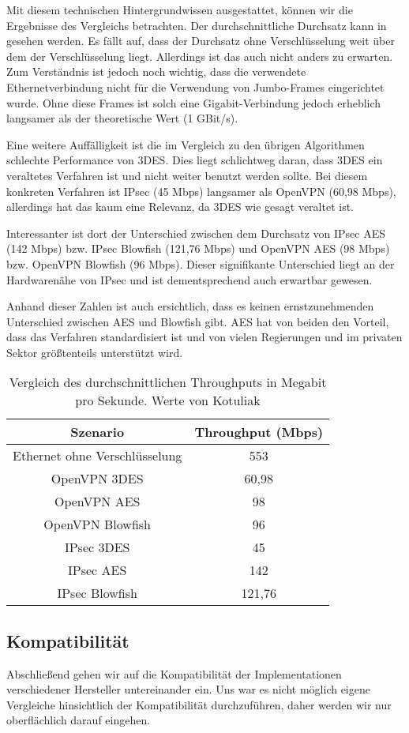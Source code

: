 \documentclass[12pt]{scrartcl}
\begin{document}
Mit diesem technischen Hintergrundwissen ausgestattet, können wir die Ergebnisse des Vergleichs betrachten. Der durchschnittliche Durchsatz kann in  gesehen werden. Es fällt auf, dass der Durchsatz ohne Verschlüsselung weit über dem der Verschlüsselung liegt. Allerdings ist das auch nicht anders zu erwarten. Zum Verständnis ist jedoch noch wichtig, dass die verwendete Ethernetverbindung nicht für die Verwendung von Jumbo-Frames eingerichtet wurde. Ohne diese Frames ist solch eine Gigabit-Verbindung jedoch erheblich langsamer als der theoretische Wert (1 GBit/s).\cite{Kotuliak2011}

Eine weitere Auffälligkeit ist die im Vergleich zu den übrigen Algorithmen schlechte Performance von 3DES. Dies liegt schlichtweg daran, dass 3DES ein veraltetes Verfahren ist und nicht weiter benutzt werden sollte. Bei diesem konkreten Verfahren ist IPsec (45 Mbps) langsamer als OpenVPN (60,98 Mbps), allerdings hat das kaum eine Relevanz, da 3DES wie gesagt veraltet ist.

Interessanter ist dort der Unterschied zwischen dem Durchsatz von IPsec AES (142 Mbps) bzw. IPsec Blowfish (121,76 Mbps) und OpenVPN AES (98 Mbps) bzw. OpenVPN Blowfish (96 Mbps). Dieser signifikante Unterschied liegt an der Hardwarenähe von IPsec und ist dementsprechend auch erwartbar gewesen.

Anhand dieser Zahlen ist auch ersichtlich, dass es keinen ernstzunehmenden Unterschied zwischen AES und Blowfish gibt. AES hat von beiden den Vorteil, dass das Verfahren standardisiert ist und von vielen Regierungen und im privaten Sektor größtenteils unterstützt wird.

\begin{table}
\caption{Vergleich des durchschnittlichen Throughputs in Megabit pro Sekunde. Werte von Kotuliak\cite{Kotuliak2011}}
\label{tab:tp}
\begin{tabular}{c|c}
Szenario & Throughput (Mbps) \\
\hline
Ethernet ohne Verschlüsselung & 553 \\
OpenVPN 3DES & 60,98 \\
OpenVPN AES & 98 \\
OpenVPN Blowfish & 96 \\
IPsec 3DES & 45 \\
IPsec AES & 142 \\
IPsec Blowfish & 121,76
\end{tabular}
\end{table}

\subsection{Kompatibilität}
Abschließend gehen wir auf die Kompatibilität der Implementationen verschiedener Hersteller untereinander ein. Uns war es nicht möglich eigene Vergleiche hinsichtlich der Kompatibilität durchzuführen, daher werden wir nur oberflächlich darauf eingehen.
\end{document}
